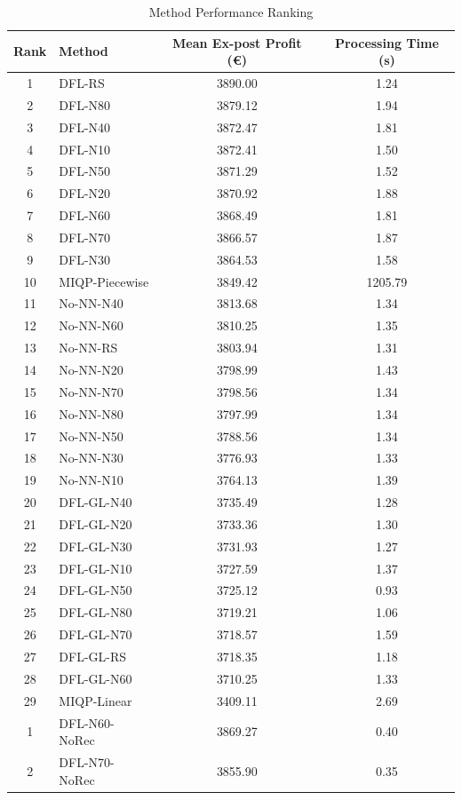 \begin{table}[h]
\centering
\caption{Method Performance Ranking}
\label{tab:method_ranking}
\begin{tabular}{clcc}
\toprule
Rank & Method & Mean Ex-post Profit (€) & Processing Time (s) \\
\midrule
1 & DFL-RS & 3890.00 & 1.24 \\
2 & DFL-N80 & 3879.12 & 1.94 \\
3 & DFL-N40 & 3872.47 & 1.81 \\
4 & DFL-N10 & 3872.41 & 1.50 \\
5 & DFL-N50 & 3871.29 & 1.52 \\
6 & DFL-N20 & 3870.92 & 1.88 \\
7 & DFL-N60 & 3868.49 & 1.81 \\
8 & DFL-N70 & 3866.57 & 1.87 \\
9 & DFL-N30 & 3864.53 & 1.58 \\
10 & MIQP-Piecewise & 3849.42 & 1205.79 \\
11 & No-NN-N40 & 3813.68 & 1.34 \\
12 & No-NN-N60 & 3810.25 & 1.35 \\
13 & No-NN-RS & 3803.94 & 1.31 \\
14 & No-NN-N20 & 3798.99 & 1.43 \\
15 & No-NN-N70 & 3798.56 & 1.34 \\
16 & No-NN-N80 & 3797.99 & 1.34 \\
17 & No-NN-N50 & 3788.56 & 1.34 \\
18 & No-NN-N30 & 3776.93 & 1.33 \\
19 & No-NN-N10 & 3764.13 & 1.39 \\
20 & DFL-GL-N40 & 3735.49 & 1.28 \\
21 & DFL-GL-N20 & 3733.36 & 1.30 \\
22 & DFL-GL-N30 & 3731.93 & 1.27 \\
23 & DFL-GL-N10 & 3727.59 & 1.37 \\
24 & DFL-GL-N50 & 3725.12 & 0.93 \\
25 & DFL-GL-N80 & 3719.21 & 1.06 \\
26 & DFL-GL-N70 & 3718.57 & 1.59 \\
27 & DFL-GL-RS & 3718.35 & 1.18 \\
28 & DFL-GL-N60 & 3710.25 & 1.33 \\
29 & MIQP-Linear & 3409.11 & 2.69 \\
\midrule
1 & DFL-N60-NoRec & 3869.27 & 0.40 \\
2 & DFL-N70-NoRec & 3855.90 & 0.35 \\

\end{tabular}
\end{table}
